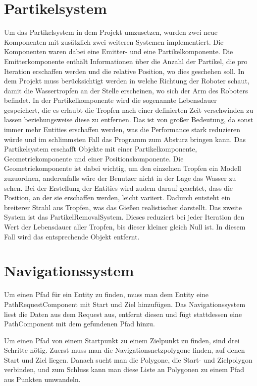 \section{Partikelsystem}
Um das Partikelsystem in dem Projekt umzusetzen, wurden zwei neue Komponenten mit zusätzlich zwei weiteren Systemen implementiert. Die Komponenten waren dabei eine Emitter- und eine Partikelkomponente. Die Emitterkomponente enthält Informationen über die Anzahl der Partikel, die pro Iteration erschaffen werden und die relative Position, wo dies geschehen soll. In dem Projekt muss berücksichtigt werden in welche Richtung der Roboter schaut, damit die Wassertropfen an der Stelle erscheinen, wo sich der Arm des Roboters befindet. In der Partikelkomponente wird die sogenannte Lebensdauer gespeichert, die es erlaubt die Tropfen nach einer definierten Zeit verschwinden zu lassen beziehungsweise diese zu entfernen. Das ist von großer Bedeutung, da sonst immer mehr Entities erschaffen werden, was die Performance stark reduzieren würde und im schlimmsten Fall das Programm zum Absturz bringen kann. Das Partikelsystem erschafft Objekte mit einer Partikelkomponente, Geometriekomponente und einer Positionskomponente. Die Geometriekomponente ist dabei wichtig, um den einzelnen Tropfen ein Modell zuzuordnen, anderenfalls wäre der Benutzer nicht in der Lage das Wasser zu sehen. Bei der Erstellung der Entities wird zudem darauf geachtet, dass die Position, an der sie erschaffen werden, leicht variiert. Dadurch entsteht ein breiterer Strahl aus Tropfen, was das Gießen realistischer darstellt. Das zweite System ist das PartikelRemovalSystem. Dieses reduziert bei jeder Iteration den Wert der Lebensdauer aller Tropfen, bis dieser kleiner gleich Null ist. In diesem Fall wird das entsprechende Objekt entfernt.
\section{Navigationssystem}

Um einen Pfad für ein Entity zu finden, muss man dem Entity eine PathRequestComponent mit Start und Ziel hinzufügen. Das Navigationssystem liest die Daten aus dem Request aus, entfernt diesen und fügt stattdessen eine PathComponent mit dem gefundenen Pfad hinzu.

Um einen Pfad von einem Startpunkt zu einem Zielpunkt zu finden, sind drei Schritte nötig. Zuerst muss man die Navigationsnetzpolygone finden, auf denen Start und Ziel liegen. Danach sucht man die Polygone, die Start- und Zielpolygon verbinden, und zum Schluss kann man diese Liste an Polygonen zu einem Pfad aus Punkten umwandeln.


